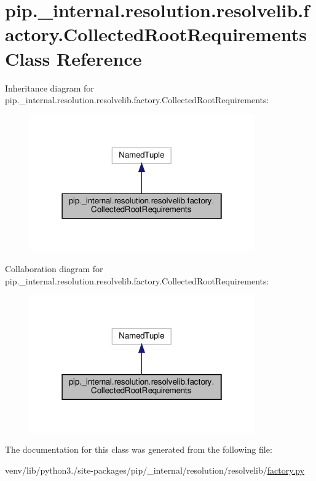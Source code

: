 \hypertarget{classpip_1_1__internal_1_1resolution_1_1resolvelib_1_1factory_1_1CollectedRootRequirements}{}\section{pip.\+\_\+internal.\+resolution.\+resolvelib.\+factory.\+Collected\+Root\+Requirements Class Reference}
\label{classpip_1_1__internal_1_1resolution_1_1resolvelib_1_1factory_1_1CollectedRootRequirements}


Inheritance diagram for pip.\+\_\+internal.\+resolution.\+resolvelib.\+factory.\+Collected\+Root\+Requirements\+:
\nopagebreak
\begin{figure}[H]
\begin{center}
\leavevmode
\includegraphics[width=274pt]{classpip_1_1__internal_1_1resolution_1_1resolvelib_1_1factory_1_1CollectedRootRequirements__inherit__graph}
\end{center}
\end{figure}


Collaboration diagram for pip.\+\_\+internal.\+resolution.\+resolvelib.\+factory.\+Collected\+Root\+Requirements\+:
\nopagebreak
\begin{figure}[H]
\begin{center}
\leavevmode
\includegraphics[width=274pt]{classpip_1_1__internal_1_1resolution_1_1resolvelib_1_1factory_1_1CollectedRootRequirements__coll__graph}
\end{center}
\end{figure}


The documentation for this class was generated from the following file\+:\begin{DoxyCompactItemize}
\item 
venv/lib/python3./site-\/packages/pip/\+\_\+internal/resolution/resolvelib/\hyperlink{factory_8py}{factory.\+py}\end{DoxyCompactItemize}
